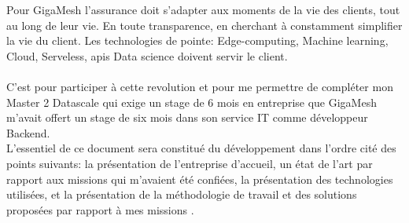 \documentclass[
11pt, %
french, %
singlespacing, %
headsepline, %
]{MastersDoctoralThesis} %
\begin{document}
Pour GigaMesh l'assurance doit s'adapter aux moments de la vie des clients, tout au long de leur vie. En toute transparence, en cherchant 
à constamment simplifier la vie du client. Les technologies de pointe: Edge-computing, Machine learning, Cloud, Serveless, apis Data science
doivent servir le client. \\ \\
C'est pour participer à cette revolution et pour me  permettre de compléter mon Master 2 Datascale qui exige un stage de 6 mois en entreprise que GigaMesh m'avait offert un stage de six mois dans son service IT comme développeur Backend.\\ L’essentiel de ce document sera constitué du développement dans l’ordre cité des points suivants: la
présentation de l’entreprise d’accueil, un état de l'art par rapport aux missions qui m'avaient été confiées, la présentation des technologies utilisées, et la présentation de la méthodologie de travail et des solutions proposées  par rapport à mes missions .
 

 
\end{document}
